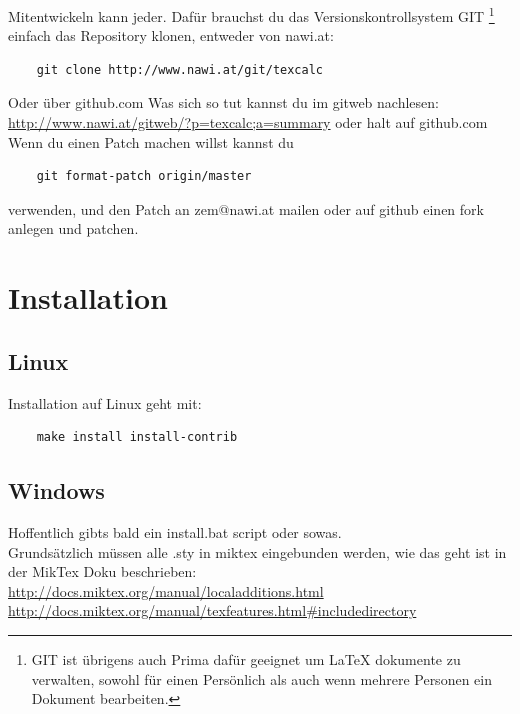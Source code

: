 \documentclass[a4paper]{article}
\begin{document}
Mitentwickeln kann jeder. Dafür brauchst du das Versionskontrollsystem GIT
\footnote{GIT ist übrigens auch Prima dafür geeignet um LaTeX dokumente zu verwalten,
sowohl für einen Persönlich als auch wenn mehrere Personen ein Dokument bearbeiten. }
einfach das Repository klonen, entweder von nawi.at:

\begin{verbatim}
	git clone http://www.nawi.at/git/texcalc
\end{verbatim}

Oder über github.com Was sich so tut kannst du im gitweb nachlesen:
\url{http://www.nawi.at/gitweb/?p=texcalc;a=summary} oder halt auf github.com\\

Wenn du einen Patch machen willst kannst du

\begin{verbatim}
	git format-patch origin/master
\end{verbatim}

verwenden, und den Patch an zem@nawi.at mailen oder auf github einen fork
anlegen und patchen.


\section{Installation}

\subsection{Linux}

Installation auf Linux geht mit:

\begin{verbatim}
	make install install-contrib
\end{verbatim}

\subsection{Windows}

Hoffentlich gibts bald ein install.bat script oder sowas. \\

Grundsätzlich müssen alle .sty in miktex eingebunden werden, wie das
geht ist in der MikTex Doku beschrieben:\\

\url{http://docs.miktex.org/manual/localadditions.html}\\
\url{http://docs.miktex.org/manual/texfeatures.html#includedirectory}\\
\end{document}
